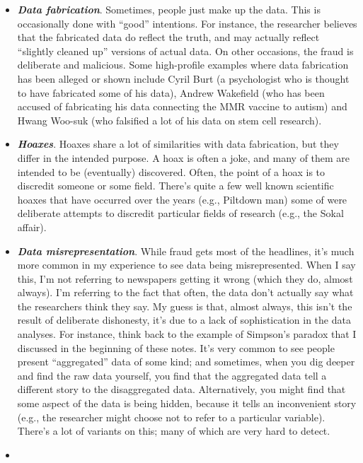 \documentclass[]{book}
\providecommand{\tightlist}{%
  \setlength{\itemsep}{0pt}\setlength{\parskip}{0pt}}
\begin{document}
\begin{itemize}
\tightlist
\item
  \textbf{\emph{Data fabrication}}. Sometimes, people just make up the data. This is occasionally done with ``good'' intentions. For instance, the researcher believes that the fabricated data do reflect the truth, and may actually reflect ``slightly cleaned up'' versions of actual data. On other occasions, the fraud is deliberate and malicious. Some high-profile examples where data fabrication has been alleged or shown include Cyril Burt (a psychologist who is thought to have fabricated some of his data), Andrew Wakefield (who has been accused of fabricating his data connecting the MMR vaccine to autism) and Hwang Woo-suk (who falsified a lot of his data on stem cell research).\\
\item
  \textbf{\emph{Hoaxes}}. Hoaxes share a lot of similarities with data fabrication, but they differ in the intended purpose. A hoax is often a joke, and many of them are intended to be (eventually) discovered. Often, the point of a hoax is to discredit someone or some field. There's quite a few well known scientific hoaxes that have occurred over the years (e.g., Piltdown man) some of were deliberate attempts to discredit particular fields of research (e.g., the Sokal affair).
\item
  \textbf{\emph{Data misrepresentation}}. While fraud gets most of the headlines, it's much more common in my experience to see data being misrepresented. When I say this, I'm not referring to newspapers getting it wrong (which they do, almost always). I'm referring to the fact that often, the data don't actually say what the researchers think they say. My guess is that, almost always, this isn't the result of deliberate dishonesty, it's due to a lack of sophistication in the data analyses. For instance, think back to the example of Simpson's paradox that I discussed in the beginning of these notes. It's very common to see people present ``aggregated'' data of some kind; and sometimes, when you dig deeper and find the raw data yourself, you find that the aggregated data tell a different story to the disaggregated data. Alternatively, you might find that some aspect of the data is being hidden, because it tells an inconvenient story (e.g., the researcher might choose not to refer to a particular variable). There's a lot of variants on this; many of which are very hard to detect.
\item

\end{itemize}
\end{document}
